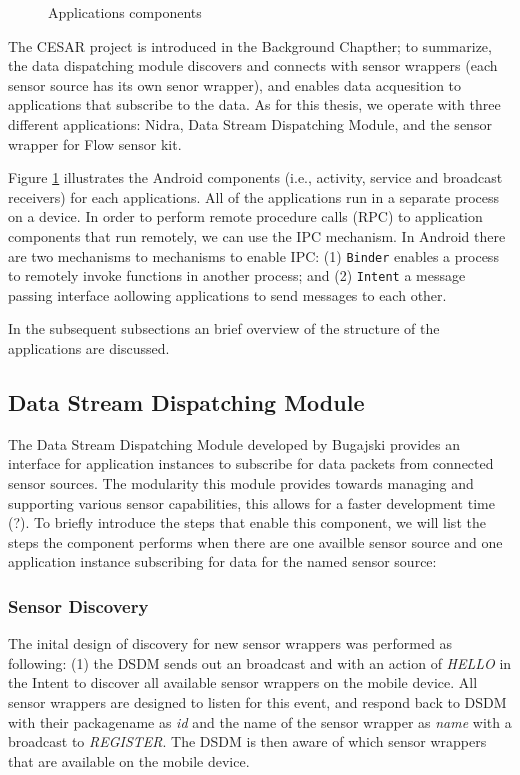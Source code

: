\begin{figure}
    \caption{Applications components}
    \label{fig:app_components}
\end{figure}

The CESAR project is introduced in the Background Chapther; to summarize, the data dispatching module discovers and connects with sensor wrappers (each sensor source has its own senor wrapper), and enables data acquesition to applications that subscribe to the data. As for this thesis, we operate with three different applications: Nidra, Data Stream Dispatching Module, and the sensor wrapper for Flow sensor kit. 

Figure \ref{fig:app_components} illustrates the Android components (i.e., activity, service and broadcast receivers) for each applications. All of the applications run in a separate process on a device. In order to perform remote procedure calls (RPC) to application components that run remotely, we can use the IPC mechanism. In Android there are two mechanisms to mechanisms to enable IPC: (1) \verb|Binder| enables a process to remotely invoke functions in another process; and (2) \verb|Intent| a message passing interface aollowing applications to send messages to each other.

In the subsequent subsections an brief overview of the structure of the applications are discussed. 

\subsection{Data Stream Dispatching Module}
The Data Stream Dispatching Module developed by Bugajski provides an interface for application instances to subscribe for data packets from connected sensor sources. The modularity this module provides towards managing and supporting various sensor capabilities, this allows for a faster development time (?). To briefly introduce the steps that enable this component, we will list the steps the component performs when there are one availble sensor source and one application instance subscribing for data for the named sensor source:

\subsubsection{Sensor Discovery}
The inital design of discovery for new sensor wrappers was performed as following: (1) the DSDM sends out an broadcast and with an action of \textit{HELLO} in the Intent to discover all available sensor wrappers on the mobile device. All sensor wrappers are designed to listen for this event, and respond back to DSDM with their packagename as \textit{id} and the name of the sensor wrapper as \textit{name} with a broadcast to \textit{REGISTER}. The DSDM is then aware of which sensor wrappers that are available on the mobile device. 
    
